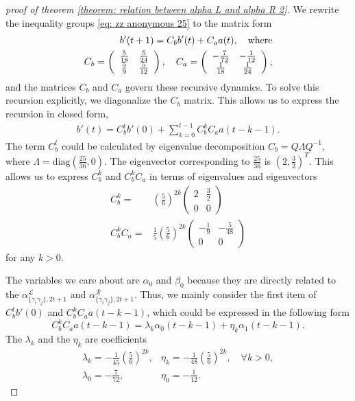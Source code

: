 \documentclass{article}
\newcommand{\alpl}{\alpha_{\{\gamma_i\gamma_j\}, 2t+1}^{\mathscr{L}}}
\newcommand{\alpr}{\alpha_{\{\gamma_i\gamma_j\}, 2t+1}^{\mathscr{R}}}
\begin{document}
\begin{proof}[proof of theorem \ref{theorem: relation between alpha L and alpha R 2}]
    We rewrite the inequality groups \eqref{eq: zz anonymous 25} to the matrix form
    \begin{align}
        b^{\prime}(t+1)=C_b b^{\prime}(t)+C_a a(t), \quad \text{where}\\
        C_b=\left(\begin{array}[15pt]{c c}
        \frac{5}{18} & \frac{5}{24} \\ 
        \frac{5}{9} & \frac{5}{12}
        \end{array}\right), \quad C_a=\left(\begin{array}{cc}
        -\frac{7}{72} & -\frac{1}{12} \\
        \frac{1}{18} & \frac{1}{24}
        \end{array}\right),
    \end{align}
    and the matrices $C_b$ and $C_a$ govern these recursive dynamics. To solve this recursion explicitly, we diagonalize the $C_b$ matrix. This allows us to express the recursion in closed form,
    \begin{align}
    b'(t)=C_b^t b'(0)+\sum_{k=0}^{t-1}C_b^kC_aa(t-k-1).
    \end{align}
The term $C_b^t$ could be calculated by eigenvalue decomposition $C_b=Q \Lambda Q^{-1}$, where $\Lambda=\text{diag}(\frac{25}{36},0)$. The eigenvector corresponding to $\frac{25}{36}$ is $(2, \frac{3}{2})^T$. This allows us to express $C_b^k$ and $C_b^kC_a$ in terms of eigenvalues and eigenvectors
\begin{align}
    C_b^k=&\left(\frac{5}{6}\right)^{2k}\begin{pmatrix}
2 & \frac{3}{2} \\
0 & 0
\end{pmatrix}\\
C_b^kC_a =& \frac{1}{5}\left(\frac{5}{6}\right)^{2k}\begin{pmatrix}
-\frac{1}{9} & -\frac{5}{48} \\
0 & 0
\end{pmatrix}
\end{align}
for any $k>0$. 

The variables we care about are $\alpha_0$ and $\beta_0$ because they are directly related to the $\alpl$ and $\alpr$. Thus, we mainly consider the first item of $C_b^t b'(0)$ and $C_b^kC_aa(t-k-1)$, which could be expressed in the following form
\begin{equation}
    C_b^kC_aa(t-k-1) = \lambda_k \alpha_0(t-k-1)+\eta_k \alpha_1(t-k-1).
\end{equation}
The $\lambda_k$ and the $\eta_k$ are coefficients 
\begin{equation}
    \begin{array}{ll}
\lambda_k=-\frac{1}{45}\left(\frac{5}{6}\right)^{2 k}, & \eta_k=-\frac{1}{48}\left(\frac{5}{6}\right)^{2 k}, \quad \forall k>0,  \\
\lambda_0=-\frac{7}{72}, & \eta_0=-\frac{1}{12}.
\end{array}
\end{equation}


\end{proof}
\end{document}

